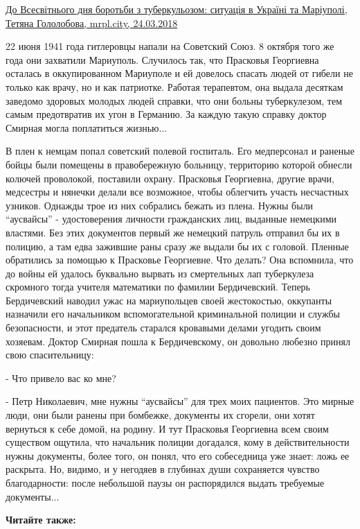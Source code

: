 \href{https://mrpl.city/blogs/view/do-vsesvitnogo-dnya-borotbi-z-tuberkulozom-situatsiya-v-ukraini-ta-mariupoli}{%
До Всесвітнього дня боротьби з туберкульозом: ситуація в Україні та Маріуполі, Тетяна Гололобова, mrpl.city, 24.03.2018}

22 июня 1941 года гитлеровцы напали на Советский Союз. 8 октября того же года
они захватили Мариуполь. Случилось так, что Прасковья Георгиевна осталась в
оккупированном Мариуполе и ей довелось спасать людей от гибели не только как
врачу, но и как патриотке. Работая терапевтом, она выдала десяткам заведомо
здоровых молодых людей справки, что они больны туберкулезом, тем самым
предотвратив их угон в Германию. За каждую такую справку доктор Смирная могла
поплатиться жизнью...

В плен к немцам попал советский полевой госпиталь. Его медперсонал и раненые
бойцы были помещены в правобережную больницу, территорию которой обнесли
колючей проволокой, поставили охрану. Прасковья Георгиевна, другие врачи,
медсестры и нянечки делали все возможное, чтобы облегчить участь несчастных
узников. Однажды трое из них собрались бежать из плена. Нужны были \enquote{аусвайсы} -
удостоверения личности гражданских лиц, выданные немецкими властями. Без этих
документов первый же немецкий патруль отправил бы их в полицию, а там едва
зажившие раны сразу же выдали бы их с головой. Пленные обратились за помощью к
Прасковье Георгиевне. Что делать? Она вспомнила, что до войны ей удалось
буквально вырвать из смертельных лап туберкулеза скромного тогда учителя
математики по фамилии Бердичевский. Теперь Бердичевский наводил ужас на
мариупольцев своей жестокостью, оккупанты назначили его начальником
вспомогательной криминальной полиции и службы безопасности, и этот предатель
старался кровавыми делами угодить своим хозяевам. Доктор Смирная пошла к
Бердичевскому, он довольно любезно принял свою спасительницу:

- Что привело вас ко мне?

- Петр Николаевич, мне нужны \enquote{аусвайсы} для трех моих пациентов. Это мирные
люди, они были ранены при бомбежке, документы их сгорели, они хотят вернуться к
себе домой, на родину. И тут Прасковья Георгиевна всем своим существом ощутила,
что начальник полиции догадался, кому в действительности нужны документы, более
того, он понял, что его собеседница уже знает: ложь ее раскрыта. Но, видимо, и
у негодяев в глубинах души сохраняется чувство благодарности: после небольшой
паузы он распорядился выдать требуемые документы...

\textbf{Читайте также:} 

